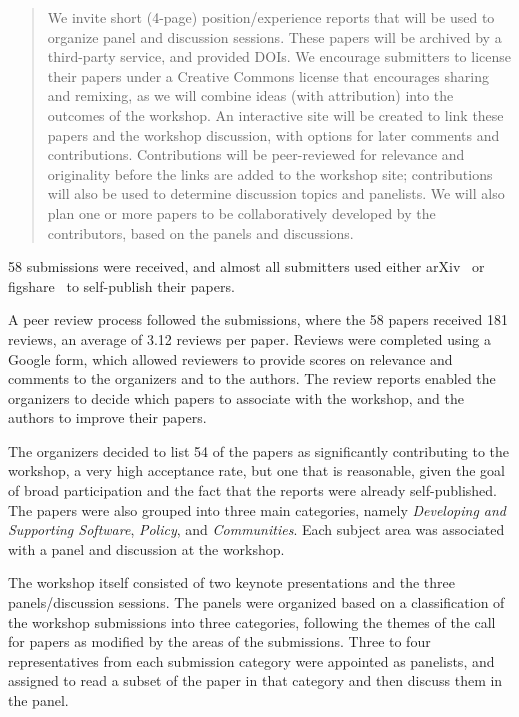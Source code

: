 \documentclass[11pt, oneside]{amsart}
\begin{document}
\begin{quote}
We invite short (4-page) position/experience reports that will be used to organize panel and 
discussion sessions. These papers will be archived by a third-party service, and provided DOIs. We 
encourage submitters to license their papers under a Creative Commons license that encourages 
sharing and remixing, as we will combine ideas (with attribution) into the outcomes of the workshop. 
An interactive site will be created to link these papers and the workshop discussion, with options for 
later comments and contributions. Contributions will be peer-reviewed for relevance and originality 
before the links are added to the workshop site; contributions will also be used to determine 
discussion topics and panelists. We will also plan one or more papers to be collaboratively 
developed by the contributors, based on the panels and discussions.
\end{quote}

58 submissions were received, and almost all submitters used either 
arXiv~\cite{arXiv-web} or 
figshare~\cite{figshare-web} to self-publish their papers. 

A peer review process followed the submissions, where the 58 papers received 181 reviews, an 
average of 3.12 reviews per paper. Reviews were completed using a Google form, which allowed 
reviewers to provide scores on relevance and comments to the organizers and to the authors. The review reports enabled the organizers to decide which papers to associate with the workshop, and the authors to improve their papers.

The organizers decided to list 54 of the papers as significantly contributing to the workshop, a very 
high acceptance rate, but one that is reasonable, given the goal of broad participation and the fact 
that the reports were already self-published. The papers were also grouped into three main categories, namely \emph{Developing and Supporting Software}, \emph{Policy}, and \emph{Communities}. Each subject area was associated with a panel and discussion at the workshop.

The workshop itself consisted of two keynote presentations and the three panels/discussion sessions. The panels 
were organized based on a classification of the workshop submissions into three categories, following 
the themes of the call for papers as modified by the areas of the submissions. Three to four representatives from 
each submission category were appointed as panelists, and assigned to read a subset of the paper in that category and then discuss them in the panel.
\end{document}

